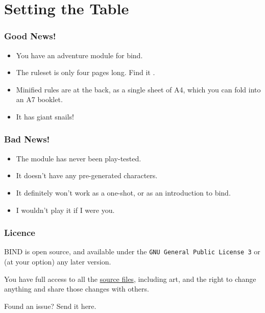 \chapter{Setting the Table}


\begin{multicols}{2}

\subsection*{Good News!}

\begin{itemize}
  \item
  You have an adventure module for \gls{bind}.
  \item
  The ruleset is only four pages long.
  Find it .
  \item
  Minified rules are at the back, as a single sheet of A4, which you can fold into an A7 booklet.
  \item
  It has giant snails!
\end{itemize}

\subsection*{Bad News!}

\begin{itemize}
  \item
  The module has never been play-tested.
  \item
  It doesn't have any pre-generated characters.
  \item
  It definitely won't work as a one-shot, or as an introduction to \gls{bind}.
  \item
  I wouldn't play it if I were you.
\end{itemize}

\columnbreak

\subsection*{Licence}

BIND is open source, and available under the {\tt GNU General Public License 3} or (at your option) any later version.

You have full access to all the \href{https://gitlab.com/bindrpg/aif}{source files}, including art, and the right to change anything and share those changes with others.

\begin{center}
  
  Found an issue?
  Send it here.
\end{center}

\end{multicols}
